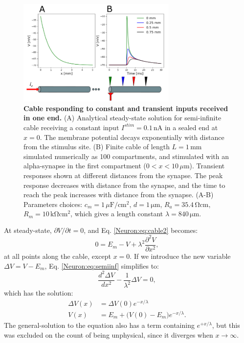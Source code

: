 \begin{figure}[!ht]
\begin{center}
\includegraphics[width=0.7\textwidth]{Figures/Neuron/Cablesims.png}
\caption{\textbf{Cable responding to constant and transient inputs received in one end.} (A) Analytical steady-state solution for semi-infinite cable receiving a constant input $I^{stim} = 0.1 \, \text{nA}$ in a sealed end at $x=0$. The membrane potential decays exponentially with distance from the stimulus site. (B) Finite cable of length $L = 1 \, \text{mm}$ simulated numerically as 100 compartments, and stimulated with an alpha-synapse in the first compartment ($0<x<10 \, \mu\text{m}$). Transient responses shown at different distances from the synapse. The peak response decreases with distance from the synapse, and the time to reach the peak increases with distance from the synapse. (A-B) Parameters choices: $c_m=1\,\mu\text{F}/\text{cm}^2$, $d = 1\, \mathrm{\mu}\text{m}$, $R_a=35.4\, \mathrm{\Omega cm}$, $R_m = 10 \, \mathrm{k\Omega cm^2}$, which gives a length constant $\lambda = 840\, \mathrm{\mu m}$. }
\end{center}
\label{Neuron:fig:Semiinf}
\end{figure}

At steady-state, $\partial V/\partial t = 0$, and Eq. \ref{Neuron:eq:cable2} becomes:
\begin{equation}
0 = E_m-V +  \lambda^2 \frac{\partial^2 V}{\partial x^2}, 
\label{Neuron:eq:semiinf}
\end{equation}
at all points along the cable, except $x=0$. If we introduce the new variable $\Delta{V}=V-E_m$, Eq. \ref{Neuron:eq:semiinf} simplifies to:
\begin{equation}
\frac{d^2 \Delta{V}}{d x^2} -  \frac{1}{\lambda^2} \Delta{V}=0, 
\label{Neuron:eq:semiinf2}
\end{equation}
which has the solution:
\begin{align}
\Delta{V}(x) &= \Delta{V}(0) e^{-x/\lambda} \\
V(x) &= E_m + \big( V(0)-E_m \big) e^{-x/\lambda}.
\label{Neuron:eq:semiinf3}
\end{align}
The general-solution to the equation also has a term containing $e^{+x/\lambda}$, but this was excluded on the count of being unphysical, since it diverges when $x \rightarrow \infty$. 

